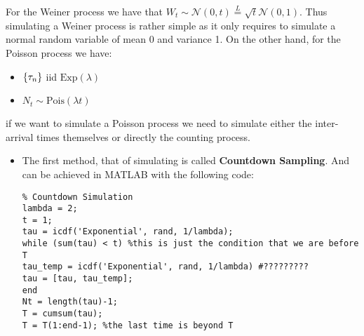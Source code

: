 \begin{recall}
For the Weiner process we have that $W_t \sim \mathcal{N}(0,t) \overset{L}{=}
\sqrt{t} \mathcal{N}(0,1)$. Thus simulating a Weiner process is rather simple as
it only requires to simulate a normal random variable of mean 0 and variance 1.
On the other hand, for the Poisson process we have:
\begin{itemize}
    \item $\{ \tau_n \}$ iid $\text{Exp}(\lambda)$
    \item $N_t \sim \text{Pois}(\lambda t)$
\end{itemize}
if we want to simulate a Poisson process we need to simulate either the
inter-arrival times themselves or directly the counting process.
\begin{itemize}
    \item The first method, that of simulating is called \textbf{Countdown
        Sampling}. And can be achieved in MATLAB with the following code:
        
\begin{verbatim}
% Countdown Simulation
lambda = 2;
t = 1;
tau = icdf('Exponential', rand, 1/lambda);
while (sum(tau) < t) %this is just the condition that we are before T
tau_temp = icdf('Exponential', rand, 1/lambda) #?????????
tau = [tau, tau_temp];
end
Nt = length(tau)-1;
T = cumsum(tau);
T = T(1:end-1); %the last time is beyond T
\end{verbatim}

\end{itemize}
\end{recall}

